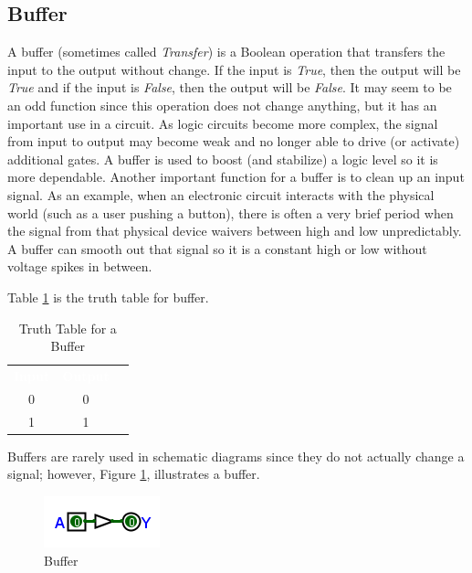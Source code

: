 \subsection{Buffer}
\label{BF:subsec:buffer}

A buffer (sometimes called \emph{Transfer}) is a Boolean operation that transfers the input to the output without change. If the input is \emph{True}, then the output will be \emph{True} and if the input is \emph{False}, then the output will be \emph{False}. It may seem to be an odd function since this operation does not change anything, but it has an important use in a circuit. As logic circuits become more complex, the signal from input to output may become weak and no longer able to drive (or activate) additional gates. A buffer is used to boost (and stabilize) a logic level so it is more dependable. Another important function for a buffer is to clean up an input signal. As an example, when an electronic circuit interacts with the physical world (such as a user pushing a button), there is often a very brief period when the signal from that physical device waivers between high and low unpredictably. A buffer can smooth out that signal so it is a constant high or low without voltage spikes in between. 

Table \ref{BF:tab:truth_table_for_a_buffer} is the truth table for buffer.

\begin{table}[H]
  \sffamily
  \newcommand{\head}[1]{\textcolor{white}{\textbf{#1}}}    
  \begin{center}
    \begin{tabular}{ccc} 
      \rowcolor{black!75}
      \head{Input} & \head{Output} \\
      0 & 0 \\
      1 & 1 
    \end{tabular}
  \end{center}
  \caption{Truth Table for a Buffer}
  \label{BF:tab:truth_table_for_a_buffer}
\end{table}

Buffers are rarely used in schematic diagrams since they do not actually change a signal; however, Figure \ref{fig:04_09}, illustrates a buffer. 

\begin{figure}[H]
	\centering
	\includegraphics[width=\maxwidth{.95\linewidth}]{gfx/04_09}
	\caption{Buffer}
	\label{fig:04_09}
\end{figure}

